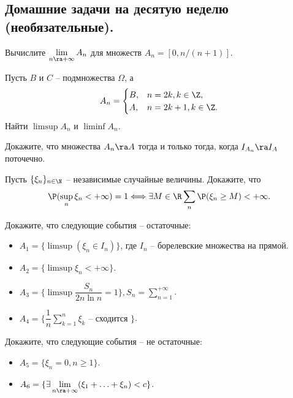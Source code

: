 \subsection{Домашние задачи на десятую неделю (необязательные).}
\begin{problem}
    Вычислите $\lim\limits_{n \ra +\infty} A_n$ для множеств $A_n = [0, n/(n + 1)]$.
\end{problem}
\begin{solution}
\end{solution}
\begin{problem}
    Пусть $B$ и $C$ -- подмножества $\Omega$, а
    \[
        A_n = \begin{cases}
                  B, & n = 2k, k \in \Z, \\
                  A, & n = 2k + 1, k \in \Z.
        \end{cases}
    \]
    Найти $\limsup A_n$ и $\liminf A_n$.
\end{problem}
\begin{solution}
\end{solution}
\begin{problem}
    Докажите, что множества $A_n \ra A$ тогда и только тогда, когда $I_{A_n} \ra I_A$ поточечно.
\end{problem}
\begin{solution}
\end{solution}
\begin{problem}
    Пусть $\{\xi_n\}_{n \in \N}$ -- независимые случайные величины.
    Докажите, что
    \[
        \P(\sup\limits_{n} \xi_n < +\infty) = 1 \Longleftrightarrow \exists M \in \R \sum\limits_{n} \P(\xi_n \geq M) < +\infty.
    \]
\end{problem}
\begin{solution}
\end{solution}
\begin{problem}
    Докажите, что следующие события -- остаточные:
    \begin{itemize}
        \item $A_1 = \{\limsup(\xi_n \in I_n)\}$, где $I_n$ -- борелевские множества на прямой.
        \item $A_2 = \{\limsup \xi_n < +\infty\}$.
        \item $A_3 = \{\limsup \dfrac{S_n}{2n \ln n} = 1\}, S_n = \sum\limits_{n = 1}^{+\infty}$.
        \item $A_4 = \{\dfrac{1}{n}\sum\limits_{k = 1}^{n} \xi_k \text{ -- сходится }\}$.
    \end{itemize}
    Докажите, что следующие события -- не остаточные:
    \begin{itemize}
        \item $A_5 = \{\xi_n = 0, n \geq 1\}$.
        \item $A_6 = \{\exists \lim\limits_{n \ra +\infty} (\xi_1 + \ldots + \xi_n) < c\}$.
    \end{itemize}
\end{problem}
\begin{solution}
\end{solution}